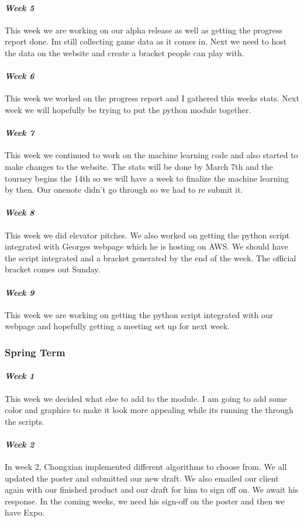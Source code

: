 \documentclass[onecolumn, draftclsnofoot,10pt, compsoc]{IEEEtran}
\begin{document}
\paragraph{\emph{Week 5}}
This week we are working on our alpha release as well as getting the progress report done. Im still collecting game data as it comes in. Next we need to host the data on the website and create a bracket people can play with.
\paragraph{\emph{Week 6}}
This week we worked on the progress report and I gathered this weeks stats. Next week we will hopefully be trying to put the python module together.
\paragraph{\emph{Week 7}}
This week we continued to work on the machine learning code and also started to make changes to the website. The stats will be done by March 7th and the tourney begins the 14th so we will have a week to finalize the machine learning by then. Our onenote didn't go through so we had to re submit it.
\paragraph{\emph{Week 8}}
This week we did elevator pitches. We also worked on getting the python script integrated with Georges webpage which he is hosting on AWS. We should have the script integrated and a bracket generated by the end of the week. The official bracket comes out Sunday.
\paragraph{\emph{Week 9}}
This week we are working on getting the python script integrated with our webpage and hopefully getting a meeting set up for next week.


\subsubsection{Spring Term}
\paragraph{\emph{Week 1}}
This week we decided what else to add to the module. I am going to add some color and graphics to make it look more appealing while its running the through the scripts.
\paragraph{\emph{Week 2}}
In week 2, Chongxian implemented different algorithms to choose from. We all updated the poster and submitted our new draft. We also emailed our client again with our finished product and our draft for him to sign off on. We await his response. In the coming weeks, we need his sign-off on the poster and then we have Expo.
\end{document}
